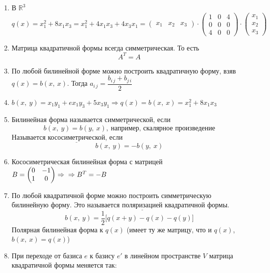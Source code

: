 \documentclass[12pt, letterpaper, twoside]{article}
\begin{document}
    \begin{enumerate}
        \item[\text{Пример:}] В $\mathbb{R}^3$
        \[q(x) = x_1^2 + 8 x_1 x_3 = x_1^2 + 4 x_1 x_3 + 4x_3 x_1 = \begin{pmatrix}
            x_1 & x_2 & x_3
        \end{pmatrix}\cdot \begin{pmatrix}
            1 & 0 & 4\\
            0 & 0 & 0\\
            4 & 0 & 0
        \end{pmatrix}\cdot \begin{pmatrix}
            x_1\\
            x_2\\
            x_3
        \end{pmatrix}\]
        \item[\text{Замечание:}] Матрица квадратичной формы всегда симметрическая. То есть \[A^T = A\]
        \item[\text{Замечание:}] По любой билинейной форме можно построить квадратичную форму, взяв $q(x) = b(x,\ x)$. Тогда $a_{i\, j} = \dfrac{b_{i\, j} + b_{j\, i}}{2}$
        \item[\text{Пример:}] $b(x,\ y) = x_1 y_1 + e x_1 y_3 + 5 x_3 y_1\Rightarrow q(x) = b(x,\ x) = x^2_1 + 8 x_1 x_3$
        \item[\text{Определение:}] Билинейная форма называется $\underline{\text{симметрической}}$, если \[b(x,\ y) = b(y,\ x),\ \text{например, скалярное произведение}\] Называется $\underline{\text{кососиметрической}}$, если \[b(x,\ y) = -b(y,\ x)\]
        \item[\text{Пример:}] Кососиметрическая билинейная форма с матрицей $B = \begin{pmatrix}
            0 & -1\\
            1 & 0
        \end{pmatrix}\Rightarrow\\\Rightarrow B^T = -B$ 
        \item[\text{Замечание:}] По любой квадратичной форме можно построить симметрическую билинейную форму. Это называется $\underline{\text{поляризацией}}$ квадратичной формы.\[b(x,\ y) = \frac{1}{2}\big[q(x + y) - q(x) - q(y)\big]\] Полярная билинейная форма к $q(x)$ \big(имеет ту же матрицу, что и $q(x)$, $b(x,\ x) = q(x)$\big)
        \item[\text{Утверждение:}] При переходе от базиса $e$ к базису $e'$ в линейном пространстве $V$ матрица квадратичной формы меняется так:

\end{enumerate}
\end{document}
